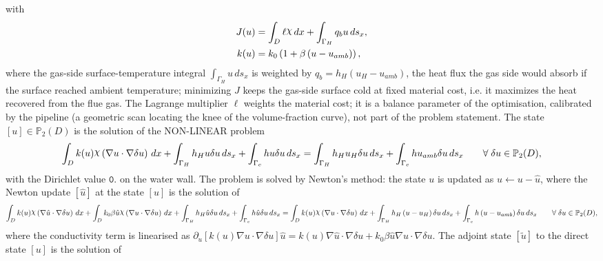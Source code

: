 \documentclass[preview]{standalone}
\let\oldcdot\cdot
\let\cdot\oldcdot
\begin{document}
with
\begin{align*}
J(u) &=  \int_{D} \ell \raisebox{\depth}{$\chi$} \,dx + \int_{\Gamma_H} q_b u \,ds_x ,\\
k(u) &= k_0 \left( 1 + \beta \left( u - u_{amb}\right)\right),
 \end{align*}
where the gas-side surface-temperature integral $\int_{\Gamma_H} u \,ds_x$ is weighted by $q_b = h_H \left( u_H - u_{amb}\right)$, the heat flux the gas side would absorb if the surface reached ambient temperature; minimizing $J$ keeps the gas-side surface cold at fixed material cost, i.e. it maximizes the heat recovered from the flue gas.  The Lagrange multiplier $\ell$ weights the material cost; it is a balance parameter of the optimisation, calibrated by the pipeline (a geometric scan locating the knee of the volume-fraction curve), not part of the problem statement.
The state $\left[ u\right] \in \mathbb P_{2}(D)$ is the solution of the NON-LINEAR problem
\begin{dmath*}
\int_{D} k(u) \raisebox{\depth}{$\chi$} \left(  \nabla u  \cdot  \nabla \delta u  \right) \,dx + \int_{\Gamma_H} h_H u \delta u \,ds_x + \int_{\Gamma_c} h u \delta u \,ds_x = \int_{\Gamma_H} h_H u_{H} \delta u \,ds_x + \int_{\Gamma_c} h u_{amb} \delta u \,ds_x \qquad \forall\; {\delta u\in \mathbb P_{2}(D)} ,
\end{dmath*}
with the Dirichlet value $\mathtt{\text{0.}}$ on the water wall.
The problem is solved by Newton's method: the state $u$ is updated as $u \leftarrow u - \hat u$, where the Newton update $\left[ \hat u\right]$ at the state $\left[ u\right]$ is the solution of
\begin{dmath*}
\int_{D} k(u) \raisebox{\depth}{$\chi$} \left(  \nabla \hat u  \cdot  \nabla \delta u  \right) \,dx + \int_{D} k_0 \beta \hat u \raisebox{\depth}{$\chi$} \left(  \nabla u  \cdot  \nabla \delta u  \right) \,dx + \int_{\Gamma_H} h_H \hat u \delta u \,ds_x + \int_{\Gamma_c} h \hat u \delta u \,ds_x = \int_{D} k(u) \raisebox{\depth}{$\chi$} \left(  \nabla u  \cdot  \nabla \delta u  \right) \,dx + \int_{\Gamma_H} h_H \left( u - u_H\right) \delta u \,ds_x + \int_{\Gamma_c} h \left( u - u_{amb}\right) \delta u \,ds_x \qquad \forall\; {\delta u\in \mathbb P_{2}(D)} ,
\end{dmath*}
where the conductivity term is linearised as $\partial_{u} \left[ k(u) \nabla u \cdot \nabla \delta u\right] \hat u = k(u) \nabla \hat u \cdot \nabla \delta u + k_0 \beta \hat u \nabla u \cdot \nabla \delta u$.
The adjoint state $\left[ \tilde u\right]$ to the direct state $\left[ u\right]$ is the solution of
\end{document}
